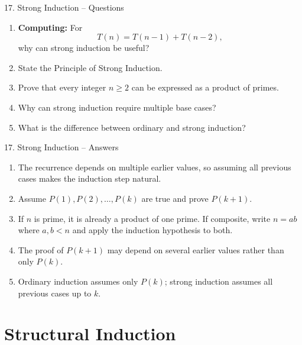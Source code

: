 \documentclass[aspectratio=169,11pt]{beamer}
\begin{document}
\begin{frame}{17. Strong Induction -- Questions}

\begin{enumerate}
\item \textbf{Computing:} For
\[
T(n)=T(n-1)+T(n-2),
\]
why can strong induction be useful?

\item State the Principle of Strong Induction.

\item Prove that every integer $n\geq2$ can be expressed as a product of primes.

\item Why can strong induction require multiple base cases?

\item What is the difference between ordinary and strong induction?
\end{enumerate}

\end{frame}

\begin{frame}{17. Strong Induction -- Answers}

\begin{enumerate}
\item The recurrence depends on multiple earlier values, so assuming all previous cases makes the induction step natural.

\item Assume $P(1),P(2),\ldots,P(k)$ are true and prove $P(k+1)$.

\item If $n$ is prime, it is already a product of one prime. If composite, write $n=ab$ where $a,b<n$ and apply the induction hypothesis to both.

\item The proof of $P(k+1)$ may depend on several earlier values rather than only $P(k)$.

\item Ordinary induction assumes only $P(k)$; strong induction assumes all previous cases up to $k$.
\end{enumerate}

\end{frame}


\section{Structural Induction}
\end{document}
